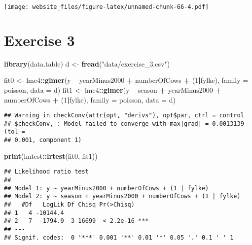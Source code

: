 \documentclass[]{book}
\newenvironment{Shaded}{\begin{snugshade}}{\end{snugshade}}
\newcommand{\KeywordTok}[1]{\textcolor[rgb]{0.13,0.29,0.53}{\textbf{#1}}}
\newcommand{\DataTypeTok}[1]{\textcolor[rgb]{0.13,0.29,0.53}{#1}}
\newcommand{\DecValTok}[1]{\textcolor[rgb]{0.00,0.00,0.81}{#1}}
\newcommand{\StringTok}[1]{\textcolor[rgb]{0.31,0.60,0.02}{#1}}
\newcommand{\OperatorTok}[1]{\textcolor[rgb]{0.81,0.36,0.00}{\textbf{#1}}}
\newcommand{\NormalTok}[1]{#1}
\begin{document}
\texttt{[image: website\_files/figure-latex/unnamed-chunk-66-4.pdf]}

\newpage

\section{Exercise 3}\label{exercise-3-1}

\begin{Shaded}
\begin{Highlighting}[]
\KeywordTok{library}\NormalTok{(data.table)}
\NormalTok{d <-}\StringTok{ }\KeywordTok{fread}\NormalTok{(}\StringTok{"data/exercise_3.csv"}\NormalTok{)}

\NormalTok{fit0 <-}\StringTok{ }\NormalTok{lme4}\OperatorTok{::}\KeywordTok{glmer}\NormalTok{(y }\OperatorTok{~}\StringTok{ }\NormalTok{yearMinus2000 }\OperatorTok{+}\StringTok{ }\NormalTok{numberOfCows }\OperatorTok{+}\StringTok{ }\NormalTok{(}\DecValTok{1}\OperatorTok{|}\NormalTok{fylke), }\DataTypeTok{family =}\NormalTok{ poisson, }\DataTypeTok{data =}\NormalTok{ d)}
\NormalTok{fit1 <-}\StringTok{ }\NormalTok{lme4}\OperatorTok{::}\KeywordTok{glmer}\NormalTok{(y }\OperatorTok{~}\StringTok{ }\NormalTok{season }\OperatorTok{+}\StringTok{ }\NormalTok{yearMinus2000 }\OperatorTok{+}\StringTok{ }\NormalTok{numberOfCows }\OperatorTok{+}\StringTok{ }\NormalTok{(}\DecValTok{1}\OperatorTok{|}\NormalTok{fylke), }\DataTypeTok{family =}\NormalTok{ poisson, }\DataTypeTok{data =}\NormalTok{ d)}
\end{Highlighting}
\end{Shaded}

\begin{verbatim}
## Warning in checkConv(attr(opt, "derivs"), opt$par, ctrl = control
## $checkConv, : Model failed to converge with max|grad| = 0.0013139 (tol =
## 0.001, component 1)
\end{verbatim}

\begin{Shaded}
\begin{Highlighting}[]
\KeywordTok{print}\NormalTok{(lmtest}\OperatorTok{::}\KeywordTok{lrtest}\NormalTok{(fit0, fit1))}
\end{Highlighting}
\end{Shaded}

\begin{verbatim}
## Likelihood ratio test
## 
## Model 1: y ~ yearMinus2000 + numberOfCows + (1 | fylke)
## Model 2: y ~ season + yearMinus2000 + numberOfCows + (1 | fylke)
##   #Df   LogLik Df Chisq Pr(>Chisq)    
## 1   4 -10144.4                        
## 2   7  -1794.9  3 16699  < 2.2e-16 ***
## ---
## Signif. codes:  0 '***' 0.001 '**' 0.01 '*' 0.05 '.' 0.1 ' ' 1
\end{verbatim}
\end{document}
